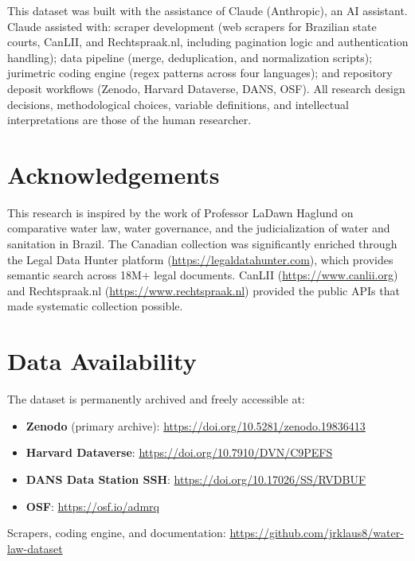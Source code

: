 \documentclass[12pt]{article}
\begin{document}
This dataset was built with the assistance of Claude (Anthropic), an AI assistant. Claude assisted with: scraper development (web scrapers for Brazilian state courts, CanLII, and Rechtspraak.nl, including pagination logic and authentication handling); data pipeline (merge, deduplication, and normalization scripts); jurimetric coding engine (regex patterns across four languages); and repository deposit workflows (Zenodo, Harvard Dataverse, DANS, OSF). All research design decisions, methodological choices, variable definitions, and intellectual interpretations are those of the human researcher.

\section{Acknowledgements}

This research is inspired by the work of Professor LaDawn Haglund on comparative water law, water governance, and the judicialization of water and sanitation in Brazil. The Canadian collection was significantly enriched through the Legal Data Hunter platform (\url{https://legaldatahunter.com}), which provides semantic search across 18M+ legal documents. CanLII (\url{https://www.canlii.org}) and Rechtspraak.nl (\url{https://www.rechtspraak.nl}) provided the public APIs that made systematic collection possible.

\section{Data Availability}

The dataset is permanently archived and freely accessible at:

\begin{itemize}[noitemsep]
  \item \textbf{Zenodo} (primary archive): \url{https://doi.org/10.5281/zenodo.19836413}
  \item \textbf{Harvard Dataverse}: \url{https://doi.org/10.7910/DVN/C9PEFS}
  \item \textbf{DANS Data Station SSH}: \url{https://doi.org/10.17026/SS/RVDBUF}
  \item \textbf{OSF}: \url{https://osf.io/admrq}
\end{itemize}

Scrapers, coding engine, and documentation: \url{https://github.com/jrklaus8/water-law-dataset}



\end{document}
